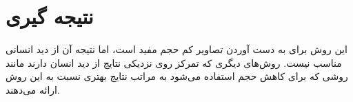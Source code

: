 \chapter{نتیجه گیری}
این روش برای به دست ‌آوردن تصاویر کم حجم مفید است، اما  نتیجه آن از دید انسانی مناسب نیست.
روش‌های دیگری که تمرکز روی نزدیکی نتایج از دید انسان دارند مانند روشی که برای کاهش حجم
استفاده می‌شود
به مراتب نتایج بهتری نسبت به این روش ارائه می‌دهند.
